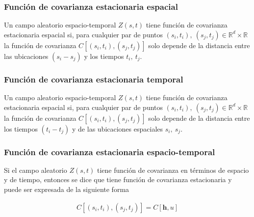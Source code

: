 \documentclass[
]{book}
\begin{document}
\hypertarget{funciuxf3n-de-covarianza-estacionaria-espacial}{%
\subsubsection*{Función de covarianza estacionaria espacial}\label{funciuxf3n-de-covarianza-estacionaria-espacial}}

Un campo aleatorio espacio-temporal \(Z(s,t)\) tiene función de covarianza estacionaria espacial si, para cualquier par de puntos \((s_i,t_i),\ (s_j,t_j) \in \mathbb{R}^d \times \mathbb{R}\) la función de covarianza \(C[(s_i,t_i),(s_j,t_j)]\) solo depende de la distancia entre las ubicaciones \((s_i-s_j)\) y los tiempos \(t_i,\ t_j\).

\hypertarget{funciuxf3n-de-covarianza-estacionaria-temporal}{%
\subsubsection*{Función de covarianza estacionaria temporal}\label{funciuxf3n-de-covarianza-estacionaria-temporal}}

Un campo aleatorio espacio-temporal \(Z(s,t)\) tiene función de covarianza estacionaria espacial si, para cualquier par de puntos \((s_i,t_i),\ (s_j,t_j) \in \mathbb{R}^d \times \mathbb{R}\) la función de covarianza \(C[(s_i,t_i),(s_j,t_j)]\) solo depende de la distancia entre los tiempos \((t_i-t_j)\) y de las ubicaciones espaciales \(s_i,\ s_j\).

\hypertarget{funciuxf3n-de-covarianza-estacionaria-espacio-temporal}{%
\subsubsection*{Función de covarianza estacionaria espacio-temporal}\label{funciuxf3n-de-covarianza-estacionaria-espacio-temporal}}

Si el campo aleatorio \(Z(s,t)\) tiene función de covarianza en términos de espacio y de tiempo, entonces se dice que tiene función de covarianza estacionaria y puede ser expresada de la siguiente forma

\begin{align}
C[(s_i,t_i),(s_j,t_j)]=C[\textbf{h},u]
\end{align}
\end{document}
